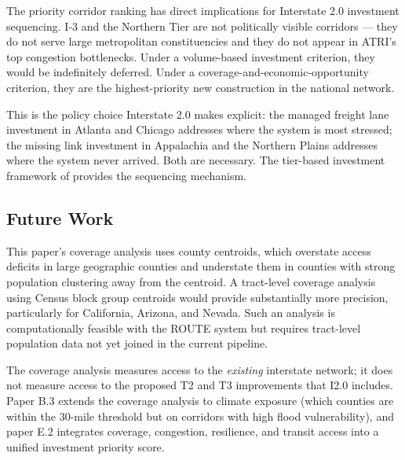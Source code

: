 The priority corridor ranking has direct implications for Interstate 2.0 investment sequencing. I-3 and the Northern Tier are not politically visible corridors --- they do not serve large metropolitan constituencies and they do not appear in ATRI's top congestion bottlenecks. Under a volume-based investment criterion, they would be indefinitely deferred. Under a coverage-and-economic-opportunity criterion, they are the highest-priority new construction in the national network.

This is the policy choice Interstate 2.0 makes explicit: the managed freight lane investment in Atlanta and Chicago addresses where the system is most stressed; the missing link investment in Appalachia and the Northern Plains addresses where the system never arrived. Both are necessary. The tier-based investment framework of \citet{ROUTE_E2} provides the sequencing mechanism.

\subsection*{Future Work}

This paper's coverage analysis uses county centroids, which overstate access deficits in large geographic counties and understate them in counties with strong population clustering away from the centroid. A tract-level coverage analysis using Census block group centroids would provide substantially more precision, particularly for California, Arizona, and Nevada. Such an analysis is computationally feasible with the ROUTE system but requires tract-level population data not yet joined in the current pipeline.

The coverage analysis measures access to the \textit{existing} interstate network; it does not measure access to the proposed T2 and T3 improvements that I2.0 includes. Paper B.3 \citep{ROUTE_B3} extends the coverage analysis to climate exposure (which counties are within the 30-mile threshold but on corridors with high flood vulnerability), and paper E.2 \citep{ROUTE_E2} integrates coverage, congestion, resilience, and transit access into a unified investment priority score.
